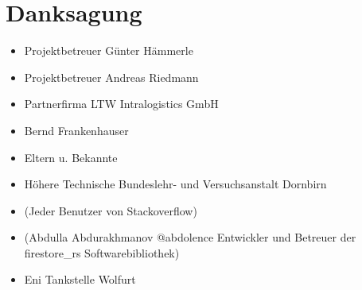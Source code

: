 \section*{Danksagung}

\begin{itemize}
  \item Projektbetreuer Günter Hämmerle
  \item Projektbetreuer Andreas Riedmann
  \item Partnerfirma LTW Intralogistics GmbH
  \item Bernd Frankenhauser
  \item Eltern u. Bekannte
  \item Höhere Technische Bundeslehr- und Versuchsanstalt Dornbirn
  \item (Jeder Benutzer von Stackoverflow)
  \item (Abdulla Abdurakhmanov @abdolence Entwickler und Betreuer der firestore\_rs Softwarebibliothek)
  \item Eni Tankstelle Wolfurt
\end{itemize}